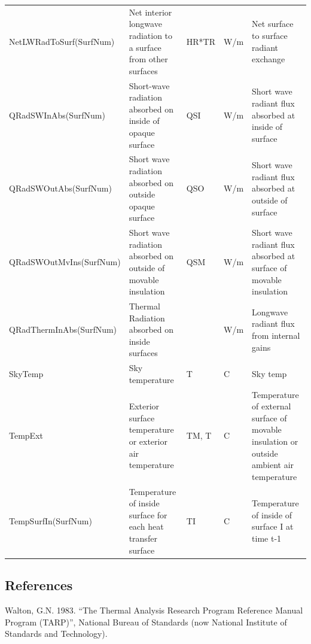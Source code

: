 {\begin{longtable}[c]{p{1.8in}p{1.2in}p{0.9in}p{0.9in}p{1.2in}}
NetLWRadToSurf(SurfNum) & Net interior longwave radiation to a surface from other surfaces & HR*TR & W/m & Net surface to surface radiant exchange \tabularnewline
QRadSWInAbs(SurfNum) & Short-wave radiation absorbed on inside of opaque surface & QSI & W/m & Short wave radiant flux absorbed at inside of surface \tabularnewline
QRadSWOutAbs(SurfNum) & Short wave radiation absorbed on outside opaque surface & QSO & W/m & Short wave radiant flux absorbed at outside of surface \tabularnewline
QRadSWOutMvIns(SurfNum) & Short wave radiation absorbed on outside of movable insulation & QSM & W/m & Short wave radiant flux absorbed at surface of movable insulation \tabularnewline
QRadThermInAbs(SurfNum) & Thermal Radiation absorbed on inside surfaces & ~ & W/m & Longwave radiant flux from internal gains \tabularnewline
SkyTemp & Sky temperature & T & C & Sky temp \tabularnewline
TempExt & Exterior surface temperature or exterior air temperature & TM, T & C & Temperature of external surface of movable insulation or outside ambient air temperature \tabularnewline
TempSurfIn(SurfNum) & Temperature of inside surface for each heat transfer surface & TI & C & Temperature of inside of surface I at time t-1 \tabularnewline
\bottomrule
\end{longtable}}

\subsection{References}\label{references-044}

Walton, G.N. 1983. ``The Thermal Analysis Research Program Reference Manual Program (TARP)'', National Bureau of Standards (now National Institute of Standards and Technology).
